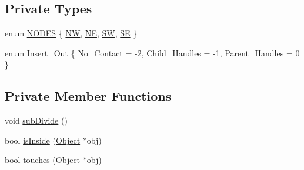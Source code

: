 \subsection*{Private Types}
\begin{DoxyCompactItemize}
\item 
enum \hyperlink{classZeta_1_1Quadtree_ace8ecc1e77d061de56fcd30fe6b89700}{N\+O\+D\+E\+S} \{ \hyperlink{classZeta_1_1Quadtree_ace8ecc1e77d061de56fcd30fe6b89700a00f51a18873e0a3e08f70b6ff2a58408}{N\+W}, 
\hyperlink{classZeta_1_1Quadtree_ace8ecc1e77d061de56fcd30fe6b89700ab8c7508608d8bd966205581a5b654b3e}{N\+E}, 
\hyperlink{classZeta_1_1Quadtree_ace8ecc1e77d061de56fcd30fe6b89700a30db909dde4808ae1e529677b362e198}{S\+W}, 
\hyperlink{classZeta_1_1Quadtree_ace8ecc1e77d061de56fcd30fe6b89700ad1d2c57a846649d1454fd1046440966c}{S\+E}
 \}
\item 
enum \hyperlink{classZeta_1_1Quadtree_af191b822596d50f3f6e76bfc7f172866}{Insert\+\_\+\+Out} \{ \hyperlink{classZeta_1_1Quadtree_af191b822596d50f3f6e76bfc7f172866add04aa16bbad7ed8f3e90020d3959500}{No\+\_\+\+Contact} = -\/2, 
\hyperlink{classZeta_1_1Quadtree_af191b822596d50f3f6e76bfc7f172866a4161ca3bd51be13b21d6b2857fb6f5c3}{Child\+\_\+\+Handles} = -\/1, 
\hyperlink{classZeta_1_1Quadtree_af191b822596d50f3f6e76bfc7f172866a63bbbb43599d0ff05855a7fad0350a93}{Parent\+\_\+\+Handles} = 0
 \}
\end{DoxyCompactItemize}
\subsection*{Private Member Functions}
\begin{DoxyCompactItemize}
\item 
void \hyperlink{classZeta_1_1Quadtree_a858356278c562b87641aa894d8215d2f}{sub\+Divide} ()
\item 
bool \hyperlink{classZeta_1_1Quadtree_a2b6fe8797312617c6864e902fad24425}{is\+Inside} (\hyperlink{classZeta_1_1Object}{Object} $\ast$obj)
\item 
bool \hyperlink{classZeta_1_1Quadtree_adde186259db20df28aa3cab2899df848}{touches} (\hyperlink{classZeta_1_1Object}{Object} $\ast$obj)
\end{DoxyCompactItemize}
